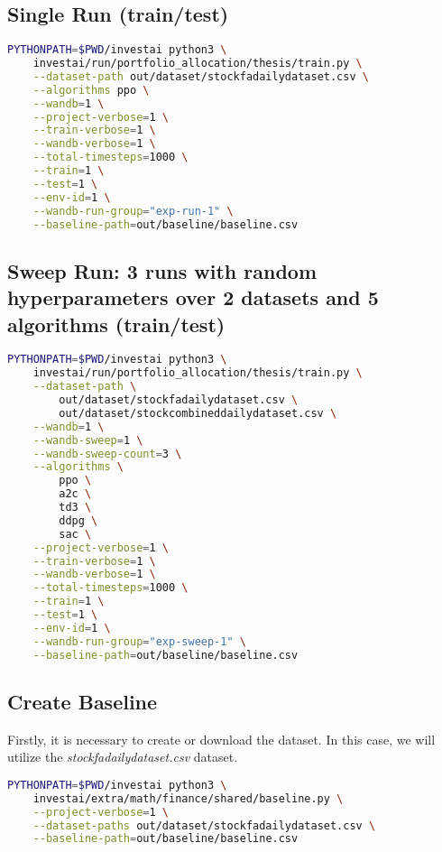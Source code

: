\documentclass[../xlapes02]{subfiles}
\begin{document}
    \subsection{Single Run (train/test)}
    \begin{lstlisting}[language=bash]
PYTHONPATH=$PWD/investai python3 \
    investai/run/portfolio_allocation/thesis/train.py \
    --dataset-path out/dataset/stockfadailydataset.csv \
    --algorithms ppo \
    --wandb=1 \
    --project-verbose=1 \
    --train-verbose=1 \
    --wandb-verbose=1 \
    --total-timesteps=1000 \
    --train=1 \
    --test=1 \
    --env-id=1 \
    --wandb-run-group="exp-run-1" \
    --baseline-path=out/baseline/baseline.csv
    \end{lstlisting}

    \subsection{Sweep Run: 3 runs with random hyperparameters over 2 datasets and 5 algorithms (train/test)}
    \begin{lstlisting}[language=bash]
PYTHONPATH=$PWD/investai python3 \
    investai/run/portfolio_allocation/thesis/train.py \
    --dataset-path \
        out/dataset/stockfadailydataset.csv \
        out/dataset/stockcombineddailydataset.csv \
    --wandb=1 \
    --wandb-sweep=1 \
    --wandb-sweep-count=3 \
    --algorithms \
        ppo \
        a2c \
        td3 \
        ddpg \
        sac \
    --project-verbose=1 \
    --train-verbose=1 \
    --wandb-verbose=1 \
    --total-timesteps=1000 \
    --train=1 \
    --test=1 \
    --env-id=1 \
    --wandb-run-group="exp-sweep-1" \
    --baseline-path=out/baseline/baseline.csv
    \end{lstlisting}

    \subsection{Create Baseline}
    Firstly, it is necessary to create or download the dataset. In this case, we will utilize the \emph{stockfadailydataset.csv} dataset.
    \begin{lstlisting}[language=bash]
PYTHONPATH=$PWD/investai python3 \
    investai/extra/math/finance/shared/baseline.py \
    --project-verbose=1 \
    --dataset-paths out/dataset/stockfadailydataset.csv \
    --baseline-path=out/baseline/baseline.csv
    \end{lstlisting}
\end{document}
